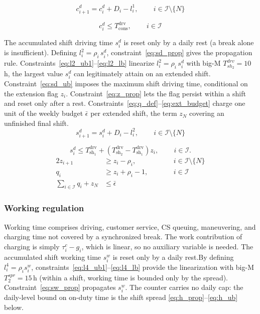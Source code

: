 \documentclass[preprint,12pt,3p]{elsarticle}
\begin{document}
\begin{equation}
    c_{i+1}^d = c_i^d + D_i - l_i^1,
    \qquad \, i \in \mathcal{I}\setminus\{N\}
    \label{eq:cd_prop}
\end{equation}

\begin{equation}
    c_i^d \leq T^{\mathrm{drv}}_{\mathrm{cons}},
    \qquad \, i \in \mathcal{I}
    \label{eq:cd_ub}
\end{equation}

The accumulated shift driving time $s_i^d$ is reset only by a daily rest (a break alone is insufficient). Defining $l_i^2 = \rho_i\, s_i^d$, constraint~\eqref{eq:sd_prop} gives the propagation rule. Constraints~\eqref{eq:l2_ub1}--\eqref{eq:l2_lb} linearize $l_i^2 = \rho_i\, s_i^d$ with big-M $T^{drv}_{sh_2} = 10$\,h, the largest value $s^d_i$ can legitimately attain on an extended shift. Constraint~\eqref{eq:sd_ub} imposes the maximum shift driving time, conditional on the extension flag $z_i$. Constraint~\eqref{eq:z_prop} lets the flag persist within a shift and reset only after a rest. Constraints~\eqref{eq:q_def}--\eqref{eq:ext_budget} charge one unit of the weekly budget $\bar\epsilon$ per extended shift, the term $z_N$ covering an unfinished final shift.
\begin{equation}
    s_{i+1}^d = s_i^d + D_i - l_i^2,
    \qquad \, i \in \mathcal{I}\setminus\{N\}
    \label{eq:sd_prop}
\end{equation}

\begin{equation}
    s_i^d \leq T^{\mathrm{drv}}_{\mathrm{sh_1}} +(T^{\mathrm{drv}}_{\mathrm{sh_2}} - T^{\mathrm{drv}}_{\mathrm{sh_1}}) z_i ,
    \qquad \, i \in \mathcal{I}.
    \label{eq:sd_ub}
\end{equation}
\begin{alignat}{2}
    z_{i+1} &\geq z_i - \rho_i, &\qquad& i \in \mathcal{I}\setminus\{N\}
    \label{eq:z_prop}\\
    q_i &\geq z_i + \rho_i - 1, &\qquad& i \in \mathcal{I}
    \label{eq:q_def}\\
    \sum_{i \in \mathcal I} q_i + z_N &\leq \bar\epsilon &&
    \label{eq:ext_budget}
\end{alignat}




\subsubsection{Working regulation}
Working time comprises driving, customer service, CS queuing, maneuvering, and charging time not covered by a synchronized break. The work contribution of charging is simply $\tau^c_i - g_i$, which is linear, so no auxiliary variable is needed. The accumulated shift working time $s_i^w$ is reset only by a daily rest.By defining $l^4_i = \rho_i s^w_i$,  constraints~\eqref{eq:l4_ub1}--\eqref{eq:l4_lb} provide the linearization with big-M $T^{spr}_2 = 15$\,h (within a shift, working time is bounded only by the spread). Constraint~\eqref{eq:sw_prop} propagates $s^w_i$. The counter carries no daily cap: the daily-level bound on on-duty time is the shift spread \eqref{eq:h_prop}--\eqref{eq:h_ub} below.
\end{document}
